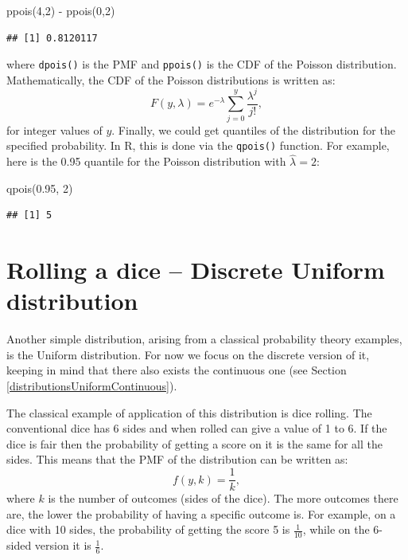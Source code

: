 \documentclass[
]{book}
\newenvironment{Shaded}{\begin{snugshade}}{\end{snugshade}}
\newcommand{\DecValTok}[1]{\textcolor[rgb]{0.00,0.00,0.81}{#1}}
\newcommand{\FloatTok}[1]{\textcolor[rgb]{0.00,0.00,0.81}{#1}}
\newcommand{\FunctionTok}[1]{\textcolor[rgb]{0.00,0.00,0.00}{#1}}
\newcommand{\NormalTok}[1]{#1}
\newcommand{\SpecialCharTok}[1]{\textcolor[rgb]{0.00,0.00,0.00}{#1}}
\theoremstyle{definition}
\theoremstyle{definition}
\theoremstyle{definition}
\theoremstyle{definition}
\theoremstyle{remark}
\begin{document}
\begin{Shaded}
\begin{Highlighting}[]
\FunctionTok{ppois}\NormalTok{(}\DecValTok{4}\NormalTok{,}\DecValTok{2}\NormalTok{) }\SpecialCharTok{{-}} \FunctionTok{ppois}\NormalTok{(}\DecValTok{0}\NormalTok{,}\DecValTok{2}\NormalTok{)}
\end{Highlighting}
\end{Shaded}

\begin{verbatim}
## [1] 0.8120117
\end{verbatim}

where \texttt{dpois()} is the PMF and \texttt{ppois()} is the CDF of the Poisson distribution. Mathematically, the CDF of the Poisson distributions is written as:
\begin{equation}
    F(y, \lambda) = e^{-\lambda} \sum_{j=0}^{y} \frac{\lambda^j }{j!} ,
    \label{eq:PoissonCDF}
\end{equation}
for integer values of \(y\). Finally, we could get quantiles of the distribution for the specified probability. In R, this is done via the \texttt{qpois()} function. For example, here is the 0.95 quantile for the Poisson distribution with \(\hat{\lambda}=2\):

\begin{Shaded}
\begin{Highlighting}[]
\FunctionTok{qpois}\NormalTok{(}\FloatTok{0.95}\NormalTok{, }\DecValTok{2}\NormalTok{)}
\end{Highlighting}
\end{Shaded}

\begin{verbatim}
## [1] 5
\end{verbatim}

\hypertarget{distributionUniform}{%
\section{Rolling a dice -- Discrete Uniform distribution}\label{distributionUniform}}

Another simple distribution, arising from a classical probability theory examples, is the Uniform distribution. For now we focus on the discrete version of it, keeping in mind that there also exists the continuous one (see Section \ref{distributionsUniformContinuous}).

The classical example of application of this distribution is dice rolling. The conventional dice has 6 sides and when rolled can give a value of 1 to 6. If the dice is fair then the probability of getting a score on it is the same for all the sides. This means that the PMF of the distribution can be written as:
\begin{equation}
    f(y, k) = \frac{1}{k},
    \label{eq:BernoulliPMF}
\end{equation}
where \(k\) is the number of outcomes (sides of the dice). The more outcomes there are, the lower the probability of having a specific outcome is. For example, on a dice with 10 sides, the probability of getting the score 5 is \(\frac{1}{10}\), while on the 6-sided version it is \(\frac{1}{6}\).
\end{document}
